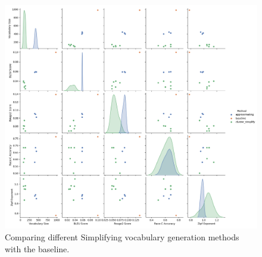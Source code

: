\begin{figure}[H]  
    \centering
    \includegraphics[width=0.9\linewidth]{figures/results/0_pairplot_vocabulary.png}
    \caption{Comparing different Simplifying vocabulary generation methods with the baseline.}
    \label{fig:compare-vocab-gen-types}
\end{figure}